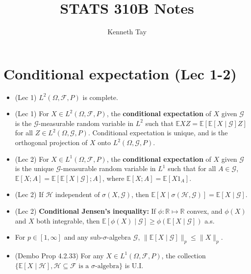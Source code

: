 \documentclass[twoside]{article}
\newcommand\bbE{\mathbb{E}}
\newcommand\bbR{\mathbb{R}}
\newcommand\calF{\mathcal{F}}
\newcommand\calG{\mathcal{G}}
\newcommand\calH{\mathcal{H}}
\newcommand\Om{\Omega}
\newcommand\sg{\sigma}
\begin{document}
\title{STATS 310B Notes}
\author{Kenneth Tay}
\date{\vspace{-3ex}}
\maketitle

\section*{Conditional expectation (Lec 1-2)}
\begin{itemize}
\item (Lec 1) $L^2(\Om, \calF, P)$ is complete.

\item (Lec 1) For $X \in L^2(\Om, \calF, P)$, the \textbf{conditional expectation} of $X$ given $\calG$ is the $\calG$-measurable random variable in $L^2$ such that $\bbE XZ = \bbE [\bbE[X \mid \calG] Z]$ for all $Z \in L^2(\Om, \calG, P)$. Conditional expectation is unique, and is the orthogonal projection of $X$ onto $L^2(\Om, \calG, P)$.

\item (Lec 2) For $X \in L^1(\Om, \calF, P)$, the \textbf{conditional expectation} of $X$ given $\calG$ is the unique $\calG$-measurable random variable in $L^1$ such that for all $A \in \calG$, $\bbE [X; A] = \bbE [\bbE[X \mid \calG]; A]$, where $\bbE [X;A] = \bbE [X1_A]$.

\item (Lec 2) If $\calH$ independent of $\sg(X, \calG)$, then $\bbE [X \mid \sg(\calH, \calG)] = \bbE [X \mid \calG]$.

\item (Lec 2) \textbf{Conditional Jensen's inequality:} If $\phi: \bbR \mapsto \bbR$ convex, and $\phi(X)$ and $X$ both integrable, then $\bbE[\phi(X) \mid \calG] \geq \phi(\bbE[X \mid \calG])$ a.s.

\item For $p \in [1, \infty]$ and any sub-$\sg$-algebra $\calG$, $\|\bbE[X \mid \calG]\|_p \leq \|X\|_p$.

\item (Dembo Prop 4.2.33) For any $X \in L^1(\Om, \calF, P)$, the collection $\{ \bbE [X \mid \calH], \calH \subseteq \calF \text{ is a $\sg$-algebra} \}$ is U.I.
\end{itemize}

\end{document}
